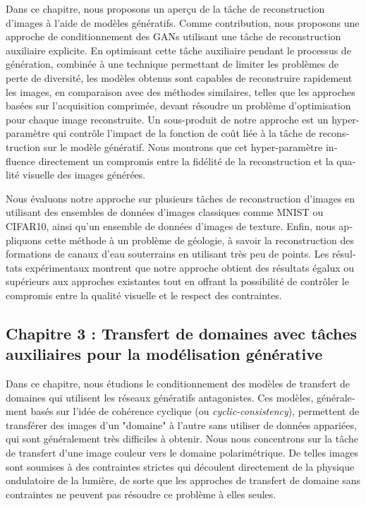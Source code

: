 \begin{otherlanguage}{french}
Dans ce chapitre, nous proposons un aperçu de la tâche de reconstruction d'images à l'aide de modèles génératifs. Comme contribution, nous proposons une approche de conditionnement des \ac{GANs} utilisant une tâche de reconstruction auxiliaire explicite. En optimisant cette tâche auxiliaire pendant le processus de génération, combinée à une technique permettant de limiter les problèmes de perte de diversité, les modèles obtenus sont capables de reconstruire rapidement les images, en comparaison avec des méthodes similaires, telles que les approches basées sur l'acquisition comprimée, devant résoudre un problème d'optimisation pour chaque image reconstruite.  Un sous-produit de notre approche est un hyper-paramètre qui contrôle l'impact de la fonction de coût liée à la tâche de reconstruction sur le modèle génératif. Nous montrons que cet hyper-paramètre influence directement un compromis entre la fidélité de la reconstruction et la qualité visuelle des images générées. 

Nous évaluons notre approche sur plusieurs tâches de reconstruction d'images en utilisant des ensembles de données d'images classiques comme MNIST ou CIFAR10, ainsi qu'un ensemble de données d'images de texture. Enfin, nous appliquons cette méthode à un problème de géologie, à savoir la reconstruction des formations de canaux d'eau souterrains en utilisant très peu de points.  Les résultats expérimentaux montrent que notre approche obtient des résultats égalux ou supérieurs aux approches existantes tout en offrant la possibilité de contrôler le compromis entre la qualité visuelle et le respect des contraintes.


\subsection*{Chapitre 3 : Transfert de domaines avec tâches auxiliaires pour la modélisation générative}

Dans ce chapitre, nous étudions le conditionnement des modèles de transfert de domaines qui utilisent les réseaux génératifs antagonistes. Ces modèles, généralement basés sur l'idée de cohérence cyclique (ou \textit{cyclic-consistency}), permettent de transférer des images d'un "domaine" à l'autre sans utiliser de données appariées, qui sont généralement très difficiles à obtenir. Nous nous concentrons sur la tâche de transfert d'une image couleur vers le domaine polarimétrique. De telles images sont soumises à des contraintes strictes qui découlent directement de la physique ondulatoire de la lumière, de sorte que les approches de transfert de domaine sans contraintes ne peuvent pas résoudre ce problème à elles seules. 


\end{otherlanguage}
